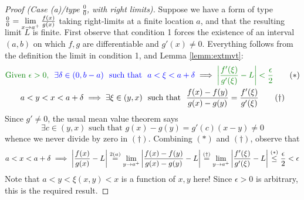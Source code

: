 \begin{proof}[Proof (Case (a)/type $\frac 00$, with right limits)]
	Suppose we have a form of type $\smash[b]{\frac 00=\lim\limits_{x\to a^+}\frac{f(x)}{g(x)}}$ taking right-limits at a finite location $a$, and that the resulting limit $L$ is finite.\smallbreak
	First observe that condition 1 forces the existence of an interval $(a,b)$ on which $f,g$ are differentiable and $g'(x)\neq 0$. Everything follows from the definition the limit in condition 1, and Lemma \ref{lemm:extmvt}:
	\begin{gather*}
		\textcolor{Green}{\text{Given $\epsilon>0$, }}\ 
		\textcolor{blue}{\exists\delta\in(0,b-a)
		\ \text{ such that }\ a<\xi<a+\delta}
		\implies \textcolor{Green}{\nm{\frac{f'(\xi)}{g'(\xi)}-L}<\frac\epsilon 2}\tag{$\ast$}\\
		a<y<x<a+\delta
		\implies \exists\xi\in(y,x) \ \text{ such that }\
		\frac{f(x)-f(y)}{g(x)-g(y)}=\frac{f'(\xi)}{g'(\xi)} \tag{$\dag$}
	\end{gather*}
	Since $g'\neq 0$, the usual mean value theorem says
	\[
		\exists c\in(y,x)
		\text{ such that } 
		g(x)-g(y)=g'(c)(x-y)\neq 0
	\]
	whence we never divide by zero in $(\dag)$. Combining $(\ast)$ and $(\dag)$, observe that
	\[
		a<x<a+\delta
		\implies \left| \frac{f(x)}{g(x)}-L\right|
		\overset{2(a)}{=}	\lim_{y\to a^+}\left| \frac{f(x)-f(y)}{g(x)-g(y)}-L\right| 
		\overset{(\dag)}{=} \lim_{y\to a^+}\left| \frac{f'(\xi)}{g'(\xi)}-L\right|
		\overset{(\ast)}{\le}\frac\epsilon 2 <\epsilon
	\]
	Note that $a<y<\xi(x,y)<x$ is a function of $x,y$ here! Since $\epsilon>0$ is arbitrary, this is the required result.
\end{proof}

